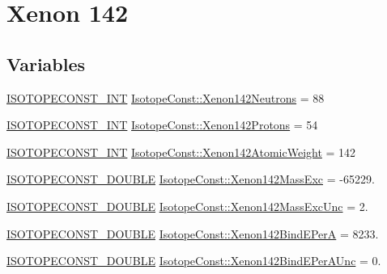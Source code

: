 \hypertarget{group___isotope_const-_xenon-_xe142}{}\section{Xenon 142}
\label{group___isotope_const-_xenon-_xe142}
\subsection*{Variables}
\begin{DoxyCompactItemize}
\item 
\mbox{\hyperlink{group___isotope_const-_macros_ga5f18360b3e99483a35c32d789e62621c}{I\+S\+O\+T\+O\+P\+E\+C\+O\+N\+S\+T\+\_\+\+I\+NT}} \mbox{\hyperlink{group___isotope_const-_xenon-_xe142_ga228600ec3be5ff5034fce83a241156c7}{Isotope\+Const\+::\+Xenon142\+Neutrons}} = 88
\item 
\mbox{\hyperlink{group___isotope_const-_macros_ga5f18360b3e99483a35c32d789e62621c}{I\+S\+O\+T\+O\+P\+E\+C\+O\+N\+S\+T\+\_\+\+I\+NT}} \mbox{\hyperlink{group___isotope_const-_xenon-_xe142_gadfdf1d6958b4e246667a06bc7acc5413}{Isotope\+Const\+::\+Xenon142\+Protons}} = 54
\item 
\mbox{\hyperlink{group___isotope_const-_macros_ga5f18360b3e99483a35c32d789e62621c}{I\+S\+O\+T\+O\+P\+E\+C\+O\+N\+S\+T\+\_\+\+I\+NT}} \mbox{\hyperlink{group___isotope_const-_xenon-_xe142_gaebc248ca1134bc46db9733e1f717b6a9}{Isotope\+Const\+::\+Xenon142\+Atomic\+Weight}} = 142
\item 
\mbox{\hyperlink{group___isotope_const-_macros_ga8f45a7272ce02c0b4c65c44636ed719a}{I\+S\+O\+T\+O\+P\+E\+C\+O\+N\+S\+T\+\_\+\+D\+O\+U\+B\+LE}} \mbox{\hyperlink{group___isotope_const-_xenon-_xe142_gae34499aaadfbe1bd03d57755a873721e}{Isotope\+Const\+::\+Xenon142\+Mass\+Exc}} = -\/65229.
\item 
\mbox{\hyperlink{group___isotope_const-_macros_ga8f45a7272ce02c0b4c65c44636ed719a}{I\+S\+O\+T\+O\+P\+E\+C\+O\+N\+S\+T\+\_\+\+D\+O\+U\+B\+LE}} \mbox{\hyperlink{group___isotope_const-_xenon-_xe142_gacaafa7d0f2390569838eb1dc602a7604}{Isotope\+Const\+::\+Xenon142\+Mass\+Exc\+Unc}} = 2.
\item 
\mbox{\hyperlink{group___isotope_const-_macros_ga8f45a7272ce02c0b4c65c44636ed719a}{I\+S\+O\+T\+O\+P\+E\+C\+O\+N\+S\+T\+\_\+\+D\+O\+U\+B\+LE}} \mbox{\hyperlink{group___isotope_const-_xenon-_xe142_gae1b1b479a4f1560270d84c8257cb3684}{Isotope\+Const\+::\+Xenon142\+Bind\+E\+PerA}} = 8233.
\item 
\mbox{\hyperlink{group___isotope_const-_macros_ga8f45a7272ce02c0b4c65c44636ed719a}{I\+S\+O\+T\+O\+P\+E\+C\+O\+N\+S\+T\+\_\+\+D\+O\+U\+B\+LE}} \mbox{\hyperlink{group___isotope_const-_xenon-_xe142_ga25fa64481267494266da3c71220abc0d}{Isotope\+Const\+::\+Xenon142\+Bind\+E\+Per\+A\+Unc}} = 0.

\end{DoxyCompactItemize}
